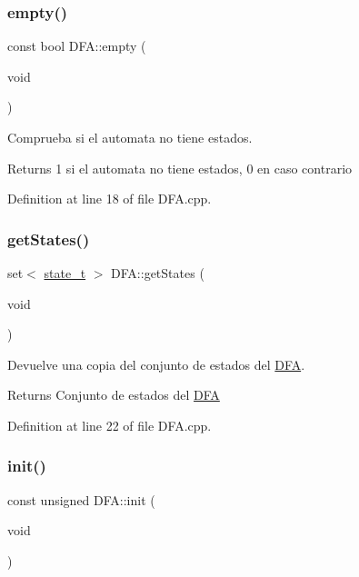 \subsubsection{\texorpdfstring{empty()}{empty()}}
{\footnotesize\ttfamily const bool D\+F\+A\+::empty (\begin{DoxyParamCaption}\item[{void}]{ }\end{DoxyParamCaption})}



Comprueba si el automata no tiene estados. 

\begin{DoxyReturn}{Returns}
\textquotesingle{}1\textquotesingle{} si el automata no tiene estados, \textquotesingle{}0\textquotesingle{} en caso contrario 
\end{DoxyReturn}


Definition at line 18 of file D\+F\+A.\+cpp.

\mbox{\label{class_d_f_a_a4fd523c42b2981f0353d9a3df1771d9e}} 
\subsubsection{\texorpdfstring{get\+States()}{getStates()}}
{\footnotesize\ttfamily set$<$ \hyperlink{classstate__t}{state\+\_\+t} $>$ D\+F\+A\+::get\+States (\begin{DoxyParamCaption}\item[{void}]{ }\end{DoxyParamCaption})}



Devuelve una copia del conjunto de estados del \hyperlink{class_d_f_a}{D\+FA}. 

\begin{DoxyReturn}{Returns}
Conjunto de estados del \hyperlink{class_d_f_a}{D\+FA} 
\end{DoxyReturn}


Definition at line 22 of file D\+F\+A.\+cpp.

\mbox{\label{class_d_f_a_a97e39f09fca7cbe4d2674797b0fdaabc}} 
\subsubsection{\texorpdfstring{init()}{init()}}
{\footnotesize\ttfamily const unsigned D\+F\+A\+::init (\begin{DoxyParamCaption}\item[{void}]{ }\end{DoxyParamCaption})}



